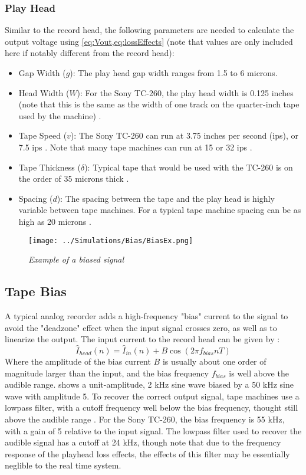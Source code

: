 \documentclass[twoside,a4paper]{article}
\begin{document}
\subsubsection{Play Head}
Similar to the record head, the following parameters
are needed to calculate the output voltage using
\cref{eq:Vout,eq:lossEffects} (note that values are only included
here if notably different from the record head):
\begin{itemize}
\item Gap Width ($g$): The play head gap width ranges from
1.5 to 6 microns\cite{Kadis}.
\item Head Width ($W$): For the Sony TC-260, the play head
width is 0.125 inches (note that this is the same as the
width of one track on the quarter-inch tape used by the 
machine) \cite{RefManual}.
\item Tape Speed ($v$): The Sony TC-260 can run at 3.75 inches
per second (ips), or 7.5 ips \cite{RefManual}. Note that many
 tape machines can run at 15 or 32 ips \cite{Kadis}.
\item Tape Thickness ($\delta$): Typical tape that would be used
with the TC-260 is on the order of 35 microns thick \cite{RefManual}.
\item Spacing ($d$): The spacing between the tape and the play
head is highly variable between tape machines. For a typical
tape machine spacing can be as high as 20 microns \cite{Kadis}.
\end{itemize}

\begin{figure}[ht]
    \center
    \texttt{[image: ../Simulations/Bias/BiasEx.png]}
    \caption{\label{Bias}{\it Example of a biased signal}}
\end{figure}
%
\subsection{Tape Bias}
A typical analog recorder adds a high-frequency "bias"
current to the signal to avoid the "deadzone" effect when the input signal
crosses zero, as well as to linearize the output. The input
current to the record head can be given by
\cite{Camras:1987:MRH:27189}:
\begin{equation}
    \hat{I}_{head}(n) = \hat{I}_{in}(n) + B \cos(2 \pi f_{bias} n T)
\end{equation}
%
Where the amplitude of the bias current $B$ is usually
about one order of magnitude larger than the input,
and the bias frequency $f_{bias}$ is well above the
audible range.  shows a unit-amplitude,
2 kHz sine wave biased by a 50 kHz sine wave with amplitude 5.
To recover the correct output signal, tape machines use a
lowpass filter, with a cutoff frequency well below the bias
frequency, thought still above the audible range \cite{Kadis}.
\newline\newline
For the Sony TC-260, the bias frequency is 55 kHz, with a gain
of 5 relative to the input signal. The lowpass filter used to recover
the audible signal has a cutoff at 24 kHz, though note that due to
the frequency response of the playhead loss effects, the effects
of this filter may be essentially neglible to the real time system.
\cite{RefManual}
\end{document}
